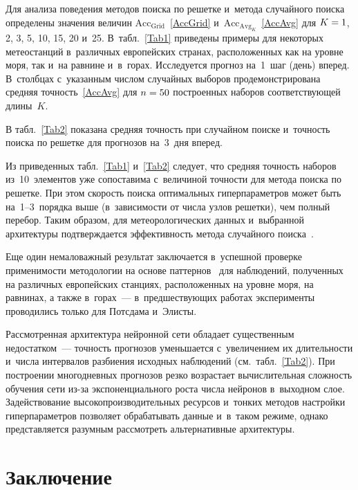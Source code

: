 \begin{multicols}{2}
Для анализа поведения методов поиска по решетке и~метода случайного поиска 
определены значения величин $\mathrm{Acc_{Grid}}$~\eqref{AccGrid} 
и~$\mathrm{Acc}_{\mathrm{Avg}_K}$~\eqref{AccAvg} для $K\hm=1$, 2, 3, 5, 10, 15, 20 и~25. 
В~табл.~\ref{Tab1} приведены примеры для некоторых метеостанций 
в~различных европейских странах, расположенных как на уровне моря, 
так и~на равнине и~в~горах. Исследуется прогноз на~1~шаг (день) вперед. 
В~столбцах с~указанным числом случайных выборов продемонстрирована средняя 
точность~\eqref{AccAvg} для $n\hm=50$ построенных наборов соответствующей длины~$K$.


В табл.~\ref{Tab2} показана средняя точность при случайном поиске 
и~точность поиска по решетке для прогнозов на~3~дня вперед.





Из приведенных табл.~\ref{Tab1} и~\ref{Tab2} следует, что средняя точность 
наборов из~10~элементов уже сопоставима с~величиной точности для метода 
поиска по решетке. При этом скорость поиска оптимальных гиперпараметров 
может быть на~1--3~порядка выше (в~зависимости от числа узлов решетки), 
чем полный перебор. Таким образом, для метеорологических данных и~выбранной 
архитектуры подтверждается эффективность метода случайного поиска~\cite{Bergstra2012}.

Еще один немаловажный результат заключается в~успешной проверке 
применимости методологии на основе паттернов~\cite{Gorshenin2017a,Gorshenin2018} 
для наблюдений, полученных на различных европейских станциях, расположенных на 
уровне моря, на равнинах, а также в~горах~--- в~предшествующих работах 
эксперименты проводились только для Потсдама и~Элисты.

Рассмотренная архитектура нейронной сети обладает существенным 
недостатком~--- точность прогнозов уменьшается с~увеличением их длительности и~числа 
интервалов разбиения исходных наблюдений (см.\ табл.~\ref{Tab2}). 
При построении многодневных прогнозов резко возрастает вычислительная 
сложность обучения сети из-за экспоненциального роста числа нейронов 
в~выходном слое. Задействование высокопроизводительных ресурсов и~тонких методов 
настройки гиперпараметров позволяет обрабатывать данные и~в~таком режиме, 
однако представляется разумным рассмотреть альтернативные архитектуры.


\section{Заключение}


\end{multicols}
